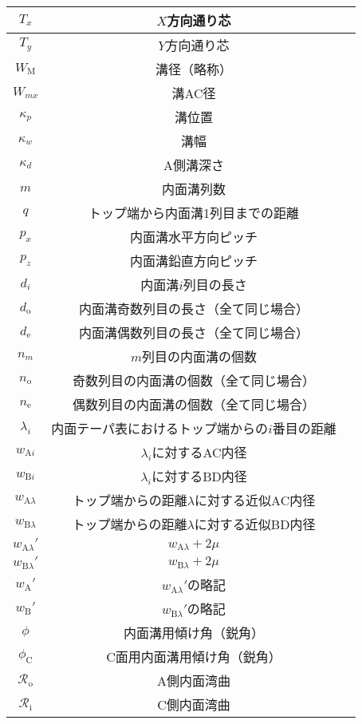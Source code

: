 \begin{longtable}{|c|Sl|}
$T_x$ & $X$方向通り芯\\\hline
$T_y$ & $Y$方向通り芯\\\hline
$W_\mathrm M$ & 溝径（略称）\\\hline
$W_{mx}$ & 溝AC径\\\hline
$\kappa_p$ & 溝位置\\\hline
$\kappa_w$ & 溝幅\\\hline
$\kappa_d$ & A側溝深さ\\\hline
$m$ & 内面溝列数\\\hline
$q$ & トップ端から内面溝1列目までの距離\\\hline
$p_x$ & 内面溝水平方向ピッチ\\\hline
$p_z$ & 内面溝鉛直方向ピッチ\\\hline
$d_i$ & 内面溝$i$列目の長さ\\\hline
$d_\mathrm o$ & 内面溝奇数列目の長さ（全て同じ場合）\\\hline
$d_\mathrm e$ & 内面溝偶数列目の長さ（全て同じ場合）\\\hline
$n_m$ & $m$列目の内面溝の個数\\\hline
$n_\mathrm o$ & 奇数列目の内面溝の個数（全て同じ場合）\\\hline
$n_\mathrm e$ & 偶数列目の内面溝の個数（全て同じ場合）\\\hline
$\lambda_i$ & 内面テーパ表におけるトップ端からの$i$番目の距離\\\hline
$w_{\mathrm Ai}$ & $\lambda_i$に対するAC内径\\\hline
$w_{\mathrm Bi}$ & $\lambda_i$に対するBD内径\\\hline
$w_{\mathrm A\lambda}$ & トップ端からの距離$\lambda$に対する近似AC内径\\\hline
$w_{\mathrm B\lambda}$ & トップ端からの距離$\lambda$に対する近似BD内径\\\hline
$w_{\mathrm A\lambda}'$ & $w_{\mathrm A\lambda}+2\mu$\\\hline
$w_{\mathrm B\lambda}'$ & $w_{\mathrm B\lambda}+2\mu$\\\hline
$w_{\mathrm A}'$ & $w_{\mathrm A\lambda}'$の略記\\\hline
$w_{\mathrm B}'$ & $w_{\mathrm B\lambda}'$の略記\\\hline
$\phi$ & 内面溝用傾け角（鋭角）\\\hline
$\phi_\mathrm C$ & C面用内面溝用傾け角（鋭角）\\\hline
$\mathcal R_\mathrm o$ & A側内面湾曲\\\hline
$\mathcal R_\mathrm i$ & C側内面湾曲\\\hline

\end{longtable}
